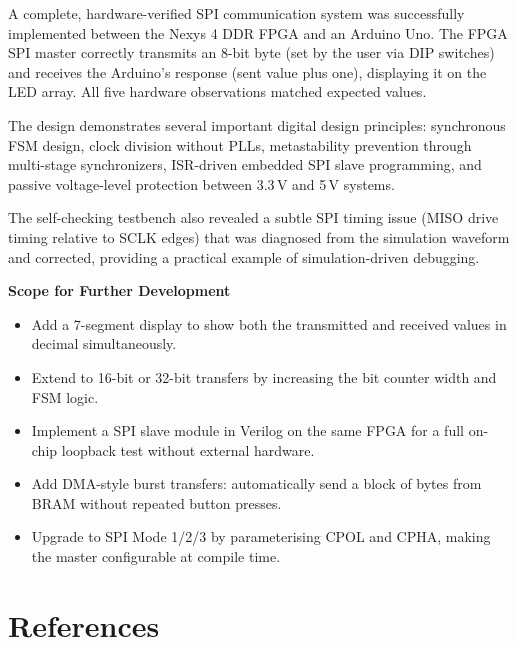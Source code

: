 \documentclass[12pt,a4paper]{report}
\begin{document}
A complete, hardware-verified SPI communication system was successfully implemented between the Nexys 4 DDR FPGA and an Arduino Uno. The FPGA SPI master correctly transmits an 8-bit byte (set by the user via DIP switches) and receives the Arduino's response (sent value plus one), displaying it on the LED array. All five hardware observations matched expected values.

The design demonstrates several important digital design principles: synchronous FSM design, clock division without PLLs, metastability prevention through multi-stage synchronizers, ISR-driven embedded SPI slave programming, and passive voltage-level protection between 3.3\,V and 5\,V systems.

The self-checking testbench also revealed a subtle SPI timing issue (MISO drive timing relative to SCLK edges) that was diagnosed from the simulation waveform and corrected, providing a practical example of simulation-driven debugging.

\textbf{Scope for Further Development}
\begin{itemize}[leftmargin=1.5em]
  \item Add a 7-segment display to show both the transmitted and received values in decimal simultaneously.
  \item Extend to 16-bit or 32-bit transfers by increasing the bit counter width and FSM logic.
  \item Implement a SPI slave module in Verilog on the same FPGA for a full on-chip loopback test without external hardware.
  \item Add DMA-style burst transfers: automatically send a block of bytes from BRAM without repeated button presses.
  \item Upgrade to SPI Mode 1/2/3 by parameterising CPOL and CPHA, making the master configurable at compile time.
\end{itemize}

\chapter{References}
\end{document}
